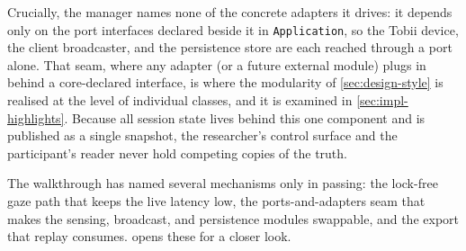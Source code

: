 Crucially, the manager names none of the concrete adapters it drives: it depends only on the port interfaces declared beside it in \texttt{Application}, so the Tobii device, the client broadcaster, and the persistence store are each reached through a port alone.
That seam, where any adapter (or a future external module) plugs in behind a core-declared interface, is where the modularity of \cref{sec:design-style} is realised at the level of individual classes, and it is examined in \cref{sec:impl-highlights}.
Because all session state lives behind this one component and is published as a single snapshot, the researcher's control surface and the participant's reader never hold competing copies of the truth.

The walkthrough has named several mechanisms only in passing: the lock-free gaze path that keeps the live latency low, the ports-and-adapters seam that makes the sensing, broadcast, and persistence modules swappable, and the export that replay consumes.
 opens these for a closer look.
\FloatBarrier
